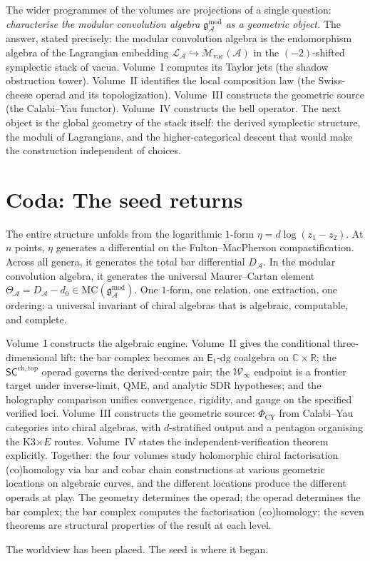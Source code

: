 \documentclass[11pt]{article}
\providecommand{\cA}{\mathcal{A}}
\providecommand{\cL}{\mathcal{L}}
\providecommand{\cM}{\mathcal{M}}
\providecommand{\cW}{\mathcal{W}}
\providecommand{\bC}{\mathbb{C}}
\providecommand{\bR}{\mathbb{R}}
\providecommand{\MC}{\mathrm{MC}}
\providecommand{\gAmod}{\mathfrak{g}_{\cA}^{\mathrm{mod}}}
\providecommand{\Eone}{\mathsf{E}_{1}}
\providecommand{\SCchtop}{\mathsf{SC}^{\mathrm{ch,top}}}
\providecommand{\Phicy}{\Phi_{\mathrm{CY}}}
\begin{document}
The wider programmes of the volumes are projections of a single
question: \emph{characterise the modular convolution algebra
$\gAmod$ as a geometric object.} The answer, stated precisely: the
modular convolution algebra is the endomorphism algebra of the
Lagrangian embedding $\cL_\cA\hookrightarrow\cM_{\mathrm{vac}}(\cA)$
in the $(-2)$-shifted symplectic stack of vacua. Volume~I computes
its Taylor jets (the shadow obstruction tower). Volume~II identifies
the local composition law (the Swiss-cheese operad and its
topologization). Volume~III constructs the geometric source (the
Calabi--Yau functor). Volume~IV constructs the bell operator. The next object is
the global geometry of the stack itself: the derived symplectic
structure, the moduli of Lagrangians, and the higher-categorical
descent that would make the construction independent of choices.

\section*{Coda: The seed returns}

\noindent
The entire structure unfolds from the logarithmic $1$-form
$\eta = d\log(z_1 - z_2)$. At $n$ points, $\eta$ generates a
differential on the Fulton--MacPherson compactification. Across all
genera, it generates the total bar differential $D_\cA$. In the
modular convolution algebra, it generates the universal
Maurer--Cartan element
$\Theta_\cA = D_\cA - d_0 \in \MC(\gAmod)$. One $1$-form, one
relation, one extraction, one ordering: a universal invariant of
chiral algebras that is algebraic, computable, and complete.

Volume~I constructs the algebraic engine. Volume~II gives the
conditional three-dimensional lift: the bar complex becomes an
$\Eone$-dg coalgebra on $\bC\times\bR$; the $\SCchtop$ operad governs
the derived-centre pair; the $\cW_\infty$ endpoint is a frontier target
under inverse-limit, QME, and analytic SDR hypotheses; and the
holography comparison unifies convergence, rigidity, and gauge on the
specified verified loci.
Volume~III constructs the geometric source: $\Phicy$ from
Calabi--Yau categories into chiral algebras, with $d$-stratified
output and a pentagon organising the K3$\times E$ routes. Volume~IV
states the independent-verification theorem explicitly. Together: the four volumes study
holomorphic chiral factorisation (co)homology via bar and cobar
chain constructions at various geometric locations on algebraic
curves, and the different locations produce the different operads at
play. The geometry determines the operad; the operad determines the
bar complex; the bar complex computes the factorisation (co)homology;
the seven theorems are structural properties of the result at each
level.

\bigskip\noindent
The worldview has been placed. The seed is where it began.
\end{document}
